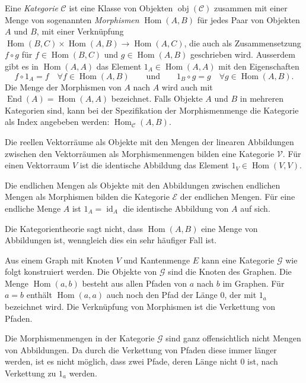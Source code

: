 \begin{definition}[Kategorie]
Eine {\em Kategorie} $\mathscr{C}$ ist eine Klasse von Objekten
$\operatorname{obj}(\mathscr{C})$ zusammen mit einer
Menge von sogenannten {\em Morphismen} $\operatorname{Hom}(A,B)$ für
jedes Paar von Objekten $A$ und $B$, mit einer Verknüpfung
$
\operatorname{Hom}(B,C)\times \operatorname{Hom}(A,B)
\to
\operatorname{Hom}(A,C)
$, die auch als Zusammensetzung $f\circ g$ für $f\in \operatorname{Hom}(B,C)$
und $g\in \operatorname{Hom}(A,B)$ geschrieben wird.
Ausserdem gibt es in $\operatorname{Hom}(A,A)$ das Element
$1_A\in\operatorname{Hom}(A,A)$ mit den Eigenschaften
\[
f\circ 1_A = f\quad\forall f\in \operatorname{Hom}(A,B)
\qquad\text{und}\qquad
1_B\circ g = g\quad\forall g\in\operatorname{Hom}(A,B).
\]
Die Menge der Morphismen von $A$ nach $A$ wird auch mit
$\operatorname{End}(A)=\operatorname{Hom}(A,A)$ bezeichnet.
Falls Objekte $A$ und $B$ in mehreren Kategorien sind, kann bei der
Spezifikation der Morphismenmenge die Kategorie als Index
angebeben werden: $\operatorname{Hom}_{\mathscr{C}}(A,B)$.
\end{definition}

\begin{beispiel}
Die reellen Vektorräume als Objekte mit den Mengen der linearen
Abbildungen zwischen den Vektorräumen als Morphismenmengen bilden
eine Kategorie $\mathscr{V}$.
Für einen Vektorraum $V$ ist die identische Abbildung das Element
$1_V\in\operatorname{Hom}(V,V)$.
\end{beispiel}

\begin{beispiel}
Die endlichen Mengen als Objekte mit den Abbildungen zwischen
endlichen Mengen als Morphismen bilden die Kategorie $\mathscr{E}$
der endlichen Mengen.
Für eine endliche Menge $A$ ist $1_A=\operatorname{id}_A$ die
identische Abbildung von $A$ auf sich.
\end{beispiel}

Die Kategorientheorie sagt nicht, dass $\operatorname{Hom}(A,B)$
eine Menge von Abbildungen ist, wenngleich dies ein sehr häufiger
Fall ist.

\begin{beispiel}
Aus einem Graph mit Knoten $V$ und Kantenmenge $E$ kann eine Kategorie
$\mathscr{G}$ wie folgt konstruiert werden.
Die Objekte von $\mathscr{G}$ sind die Knoten des Graphen.
Die Menge $\operatorname{Hom}(a,b)$ besteht aus allen Pfaden
von $a$ nach $b$ im Graphen.
Für $a=b$ enthält $\operatorname{Hom}(a,a)$ auch noch den Pfad der
Länge $0$, der mit $1_a$ bezeichnet wird.
Die Verknüpfung von Morphismen ist die Verkettung von Pfaden.

Die Morphismenmengen in der Kategorie $\mathscr{G}$ sind ganz offensichtlich
nicht Mengen von Abbildungen.
Da durch die Verkettung von Pfaden diese immer länger werden, ist es
nicht möglich, dass zwei Pfade, deren Länge nicht $0$ ist, nach
Verkettung zu $1_a$ werden.
\end{beispiel}

